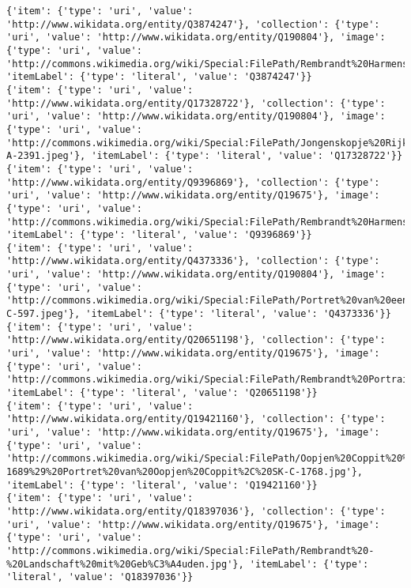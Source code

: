 \documentclass[
  letterpaper,
]{book}
\begin{document}
\begin{verbatim}
{'item': {'type': 'uri', 'value': 'http://www.wikidata.org/entity/Q3874247'}, 'collection': {'type': 'uri', 'value': 'http://www.wikidata.org/entity/Q190804'}, 'image': {'type': 'uri', 'value': 'http://commons.wikimedia.org/wiki/Special:FilePath/Rembrandt%20Harmensz.%20van%20Rijn%20012.jpg'}, 'itemLabel': {'type': 'literal', 'value': 'Q3874247'}}
{'item': {'type': 'uri', 'value': 'http://www.wikidata.org/entity/Q17328722'}, 'collection': {'type': 'uri', 'value': 'http://www.wikidata.org/entity/Q190804'}, 'image': {'type': 'uri', 'value': 'http://commons.wikimedia.org/wiki/Special:FilePath/Jongenskopje%20Rijksmuseum%20SK-A-2391.jpeg'}, 'itemLabel': {'type': 'literal', 'value': 'Q17328722'}}
{'item': {'type': 'uri', 'value': 'http://www.wikidata.org/entity/Q9396869'}, 'collection': {'type': 'uri', 'value': 'http://www.wikidata.org/entity/Q19675'}, 'image': {'type': 'uri', 'value': 'http://commons.wikimedia.org/wiki/Special:FilePath/Rembrandt%20Harmensz.%20van%20Rijn%20049.jpg'}, 'itemLabel': {'type': 'literal', 'value': 'Q9396869'}}
{'item': {'type': 'uri', 'value': 'http://www.wikidata.org/entity/Q4373336'}, 'collection': {'type': 'uri', 'value': 'http://www.wikidata.org/entity/Q190804'}, 'image': {'type': 'uri', 'value': 'http://commons.wikimedia.org/wiki/Special:FilePath/Portret%20van%20een%20vrouw%2C%20mogelijk%20Maria%20Trip%20Rijksmuseum%20SK-C-597.jpeg'}, 'itemLabel': {'type': 'literal', 'value': 'Q4373336'}}
{'item': {'type': 'uri', 'value': 'http://www.wikidata.org/entity/Q20651198'}, 'collection': {'type': 'uri', 'value': 'http://www.wikidata.org/entity/Q19675'}, 'image': {'type': 'uri', 'value': 'http://commons.wikimedia.org/wiki/Special:FilePath/Rembrandt%20Portrait%20of%20Titus%20van%20Rijn.jpg'}, 'itemLabel': {'type': 'literal', 'value': 'Q20651198'}}
{'item': {'type': 'uri', 'value': 'http://www.wikidata.org/entity/Q19421160'}, 'collection': {'type': 'uri', 'value': 'http://www.wikidata.org/entity/Q19675'}, 'image': {'type': 'uri', 'value': 'http://commons.wikimedia.org/wiki/Special:FilePath/Oopjen%20Coppit%20%281611-1689%29%20Portret%20van%20Oopjen%20Coppit%2C%20SK-C-1768.jpg'}, 'itemLabel': {'type': 'literal', 'value': 'Q19421160'}}
{'item': {'type': 'uri', 'value': 'http://www.wikidata.org/entity/Q18397036'}, 'collection': {'type': 'uri', 'value': 'http://www.wikidata.org/entity/Q19675'}, 'image': {'type': 'uri', 'value': 'http://commons.wikimedia.org/wiki/Special:FilePath/Rembrandt%20-%20Landschaft%20mit%20Geb%C3%A4uden.jpg'}, 'itemLabel': {'type': 'literal', 'value': 'Q18397036'}}

\end{verbatim}
\end{document}
